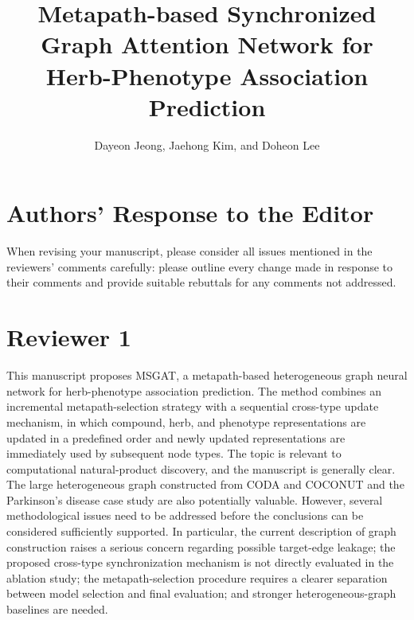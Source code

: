 \documentclass[11pt,american]{article}
\title{Metapath-based Synchronized Graph Attention Network for Herb-Phenotype Association Prediction}
\author{Dayeon Jeong, Jaehong Kim, and Doheon Lee}
\begin{document}
\maketitle

\editor
\section*{\normalsize{Authors' Response to the Editor}}

When revising your manuscript, please consider all issues mentioned in the reviewers' comments carefully: please outline every change made in response to their comments and provide suitable rebuttals for any comments not addressed.

\reviewer
\section*{\normalsize{Reviewer 1}}

This manuscript proposes MSGAT, a metapath-based heterogeneous graph neural network for herb-phenotype association prediction. The method combines an incremental metapath-selection strategy with a sequential cross-type update mechanism, in which compound, herb, and phenotype representations are updated in a predefined order and newly updated representations are immediately used by subsequent node types. The topic is relevant to computational natural-product discovery, and the manuscript is generally clear. The large heterogeneous graph constructed from CODA and COCONUT and the Parkinson's disease case study are also potentially valuable. However, several methodological issues need to be addressed before the conclusions can be considered sufficiently supported. In particular, the current description of graph construction raises a serious concern regarding possible target-edge leakage; the proposed cross-type synchronization mechanism is not directly evaluated in the ablation study; the metapath-selection procedure requires a clearer separation between model selection and final evaluation; and stronger heterogeneous-graph baselines are needed.
\end{document}
